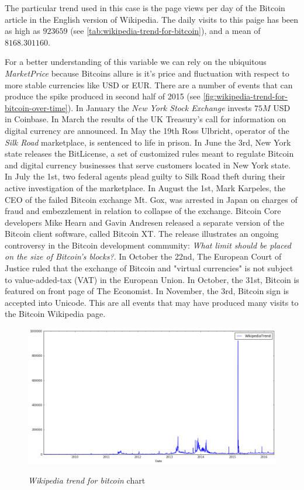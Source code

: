 The particular trend used in this case is the page views per day of
the Bitcoin article in the English version of Wikipedia. The daily
visits to this paige has been as high as $923659$ (see
\autoref{tab:wikipedia-trend-for-bitcoin}), and a mean of
$8168.301160$.

For a better understanding of this variable we can rely on the
ubiquitous \textit{MarketPrice} because Bitcoins allure is it's price
and fluctuation with respect to more stable currencies like USD or
EUR. There are a number of events that can produce the spike produced
in second half of 2015 (see
\autoref{fig:wikipedia-trend-for-bitcoin-over-time}). In January the
\textit{New York Stock Exchange} invests $75M$ USD in Coinbase. In
March the results of the UK Treasury's call for information on digital
currency are announced. In May the 19th Ross Ulbricht, operator of the
\textit{Silk Road} marketplace, is sentenced to life in prison. In
June the 3rd, New York state releases the BitLicense, a set of
customized rules meant to regulate Bitcoin and digital currency
businesses that serve customers located in New York state. In July the
1st, two federal agents plead guilty to Silk Road theft during their
active investigation of the marketplace. In August the 1st, Mark
Karpeles, the CEO of the failed Bitcoin exchange Mt. Gox, was arrested
in Japan on charges of fraud and embezzlement in relation to collapse
of the exchange. Bitcoin Core developers Mike Hearn and Gavin Andresen
released a separate version of the Bitcoin client software, called
Bitcoin XT. The release illustrates an ongoing controversy in the
Bitcoin development community: \textit{What limit should be placed on
  the size of Bitcoin's blocks?}. In October the 22nd, The European
Court of Justice ruled that the exchange of Bitcoin and "virtual
currencies" is not subject to value-added-tax (VAT) in the European
Union. In October, the 31st, Bitcoin is featured on front page of The
Economist. In November, the 3rd, Bitcoin sign is accepted into
Unicode. This are all events that may have produced many visits to the
Bitcoin Wikipedia page.

\begin{figure}[bth]
  \myfloatalign
  {\includegraphics[width=1\linewidth]
    {gfx/wikipedia-trend-for-bitcoin-over-time}}
  \caption{\textit{Wikipedia trend for bitcoin}
    chart}
  \label{fig:wikipedia-trend-for-bitcoin-over-time}
\end{figure}

